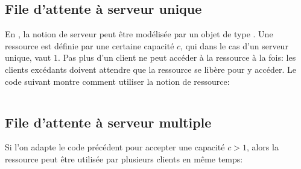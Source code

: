        \subsection{File d'attente à serveur unique}
            En , la notion de serveur peut être modélisée par un objet de type . Une ressource est définie par une certaine capacité $c$, qui dans le cas d'un serveur unique, vaut $1$. Pas plus d'un client ne peut accéder à la ressource à la fois: les clients excédants doivent attendre que la ressource se libère pour y accéder. Le code suivant montre comment utiliser la notion de ressource:
            \inputminted{python}{codes/serveur_unique.py}

        \subsection{File d'attente à serveur multiple}
            Si l'on adapte le code précédent pour accepter une capacité $c>1$, alors la ressource peut être utilisée par plusieurs clients en même temps:
            \inputminted{python}{codes/serveur_multiple.py}

